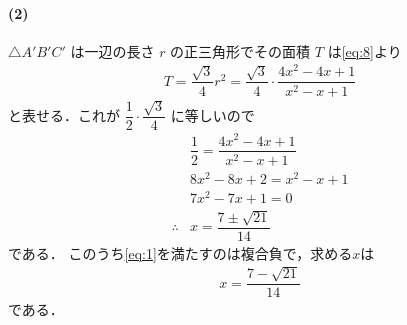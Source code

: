 \documentclass[../../main.tex]{subfiles}
\begin{document}
\paragraph{(2)}

$\triangle A'B'C'$ は一辺の長さ $r$ の正三角形でその面積 $T$ は\cref{eq:8}より
\begin{align}
  T = \dfrac{\sqrt{3}}{4} r^2 = \dfrac{\sqrt{3}}{4} \cdot \dfrac{4x^2 - 4x + 1}{x^2 - x + 1}
\end{align}
と表せる．これが $\dfrac{1}{2} \cdot \dfrac{\sqrt{3}}{4}$ に等しいので
\begin{align}
  & \dfrac{1}{2} = \dfrac{4x^2 - 4x + 1}{x^2 - x + 1} \\
  & 8x^2 - 8x + 2 = x^2 - x + 1 \\
  & 7x^2 - 7x + 1 = 0 \\
  \therefore
  & x = \dfrac{7 \pm \sqrt{21}}{14}
\end{align}
である．
このうち\cref{eq:1}を満たすのは複合負で，求める$x$は
\begin{align}
  x = \dfrac{7 - \sqrt{21}}{14}
\end{align}
である．
\end{document}
